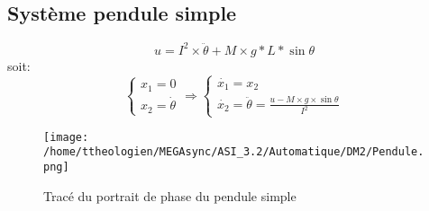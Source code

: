 \documentclass[a4paper,12pt]{article}
\begin{document}
    \subsection{Système pendule simple}
    \label{sub:Système pendule simple}
      \[u = I^2 \times \ddot{\theta} + M \times g * L * \sin{\theta}\]
      soit:
      \[
        \left\{
          \begin{array}{ll}
            x_1 = 0\\
            x_2 = \dot{\theta}
          \end{array}
        \right.
        \Rightarrow
        \left\{
          \begin{array}{ll}
            \dot{x_1} = x_2\\
            \dot{x_2} = \ddot{\theta} = \frac{u - M \times g \times \sin{\theta}}{I^2}
          \end{array}
        \right.
      \]

      \begin{figure}[h]
        \caption{Tracé du portrait de phase du pendule simple}
        \centering
        \texttt{[image: /home/ttheologien/MEGAsync/ASI\_3.2/Automatique/DM2/Pendule.png]}
      \end{figure}
\end{document}
